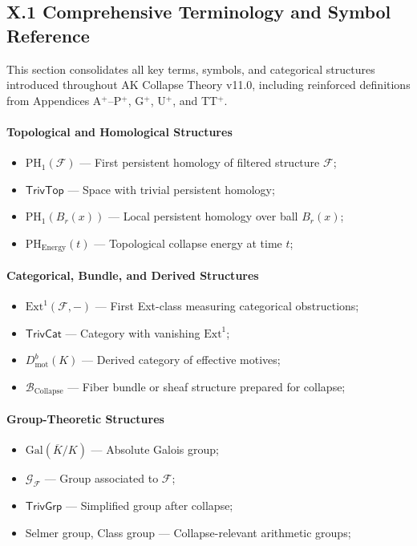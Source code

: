 \documentclass[11pt]{article}
\begin{document}
\subsection*{X.1 Comprehensive Terminology and Symbol Reference}

This section consolidates all key terms, symbols, and categorical structures introduced throughout AK Collapse Theory v11.0, including reinforced definitions from Appendices A$^{+}$–P$^{+}$, G$^{+}$, U$^{+}$, and TT$^{+}$.

\paragraph{Topological and Homological Structures}

\begin{itemize}
    \item $\mathrm{PH}_1(\mathcal{F})$ — First persistent homology of filtered structure $\mathcal{F}$;
    \item $\mathsf{TrivTop}$ — Space with trivial persistent homology;
    \item $\mathrm{PH}_1(B_r(x))$ — Local persistent homology over ball $B_r(x)$;
    \item $\mathrm{PH}_{\mathrm{Energy}}(t)$ — Topological collapse energy at time $t$;
\end{itemize}

\paragraph{Categorical, Bundle, and Derived Structures}

\begin{itemize}
    \item $\mathrm{Ext}^1(\mathcal{F}, -)$ — First Ext-class measuring categorical obstructions;
    \item $\mathsf{TrivCat}$ — Category with vanishing $\mathrm{Ext}^1$;
    \item $D^b_{\mathrm{mot}}(K)$ — Derived category of effective motives;
    \item $\mathcal{B}_{\mathrm{Collapse}}$ — Fiber bundle or sheaf structure prepared for collapse;
\end{itemize}

\paragraph{Group-Theoretic Structures}

\begin{itemize}
    \item $\mathrm{Gal}(\overline{K}/K)$ — Absolute Galois group;
    \item $\mathcal{G}_{\mathcal{F}}$ — Group associated to $\mathcal{F}$;
    \item $\mathsf{TrivGrp}$ — Simplified group after collapse;
    \item Selmer group, Class group — Collapse-relevant arithmetic groups;
\end{itemize}
\end{document}
